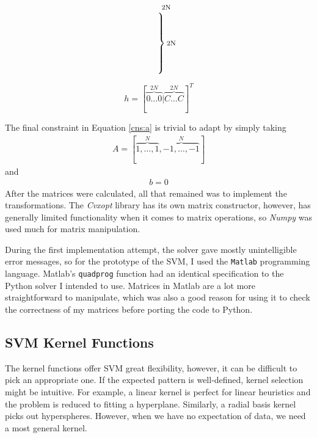 \documentclass[12pt,notitlepage,twoside]{scrreprt}
\begin{document}
\[\begin{matrix}
\begin{matrix}
      \text{\footnotesize 2N} \\
        \left.\vphantom{\begin{matrix} 0 \\ 0 \\ 0 \\ 0 \\ 0 \\ 0 \end{matrix}}\right\}
      \text{\footnotesize 2N} 
    \end{matrix}
    \mspace{-33mu}
\end{matrix}
\]


\[h = [\overbrace{0 \dots 0}^{2N}|\overbrace{C \dots C}^{2N}]^T\]

The final constraint in Equation \ref{cns:a} is trivial to adapt by simply taking 
\begin{gather*}
A=[\overbrace{1,\dots,1}^N,\overbrace{-1,\dots,-1}^N]
\end{gather*}
and
\begin{gather*}
b=0
\end{gather*}
After the matrices were calculated, all that remained was to implement the
transformations. The \textit{Cvxopt} library has its own matrix constructor,
however, has generally limited functionality when it comes to matrix
operations, so \textit{Numpy} was used much for matrix manipulation.

During the first implementation attempt, the solver gave mostly unintelligible
error messages, so for the prototype of the SVM, I used the 
\texttt{Matlab} programming language. Matlab's \texttt{quadprog} function had an identical
specification to the Python solver I intended to use.  Matrices in Matlab are a
lot more straightforward to manipulate, which was also a good reason for using it
to check the correctness of my matrices before porting the code to Python.

\subsection{SVM Kernel Functions}
\label{sec:kernels}
The kernel functions offer SVM great flexibility, however, it can be difficult to pick an
appropriate one. If the expected pattern is well-defined, kernel selection might be
intuitive. For example, a linear kernel is perfect for linear heuristics and the problem
is reduced to fitting a hyperplane.  Similarly, a radial basis kernel picks out
hyperspheres. However, when we have no expectation of data, we need a most
general kernel.
\end{document}
